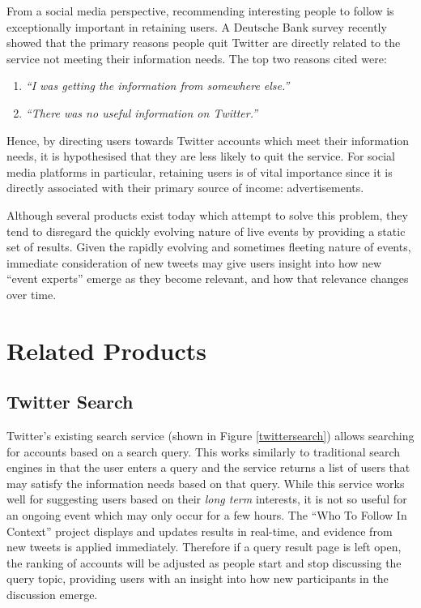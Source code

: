 \documentclass{l4proj}
\begin{document}
From a social media perspective, recommending interesting people to follow is exceptionally important in retaining users. A Deutsche Bank survey recently showed that the primary reasons people quit Twitter are directly related to the service not meeting their information needs. The top two reasons cited were:

\begin{enumerate}
    \item \textit{``I was getting the information from somewhere else.'' }
    \item \textit{``There was no useful information on Twitter.''}
\end{enumerate}

Hence, by directing users towards Twitter accounts which meet their information needs, it is hypothesised that they are less likely to quit the service. For social media platforms in particular, retaining users is of vital importance since it is directly associated with their primary source of income: advertisements.

Although several products exist today which attempt to solve this problem, they tend to disregard the quickly evolving nature of live events by providing a static set of results. Given the rapidly evolving and sometimes fleeting nature of events, immediate consideration of new tweets may give users insight into how new ``event experts'' emerge as they become relevant, and how that relevance changes over time.

\section{Related Products}

\subsection{Twitter Search}
Twitter's existing search service (shown in Figure \ref{twittersearch}) allows searching for accounts based on a search query. This works similarly to traditional search engines in that the user enters a query and the service returns a list of users that may satisfy the information needs based on that query. While this service works well for suggesting users based on their \textit{long term} interests, it is not so useful for an ongoing event which may only occur for a few hours. The ``Who To Follow In Context'' project displays and updates results in real-time, and evidence from new tweets is applied immediately. Therefore if a query result page is left open, the ranking of accounts will be adjusted as people start and stop discussing the query topic, providing users with an insight into how new participants in the discussion emerge.
\end{document}
